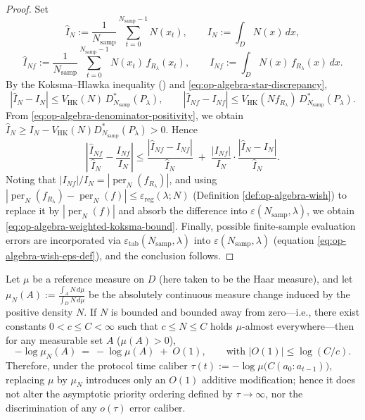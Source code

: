 \begin{proof}
Set
\[
\widehat I_{N}:=\frac{1}{N_{\mathrm{samp}}}\sum_{t=0}^{N_{\mathrm{samp}}-1}N(x_t),\qquad
I_{N}:=\int_D N(x)\,dx,
\]
\[
\widehat I_{Nf}:=\frac{1}{N_{\mathrm{samp}}}\sum_{t=0}^{N_{\mathrm{samp}}-1}N(x_t)\,f_{R_\lambda}(x_t),\qquad
I_{Nf}:=\int_D N(x)\,f_{R_\lambda}(x)\,dx.
\]
By the Koksma--Hlawka inequality (\cite{KuipersNiederreiter1974}) and \eqref{eq:op-algebra-star-discrepancy},
\[
|\widehat I_{N}-I_{N}|\le V_{\mathrm{HK}}(N)\,D_{N_{\mathrm{samp}}}^{\ast}(P_\lambda),
\qquad
|\widehat I_{Nf}-I_{Nf}|\le V_{\mathrm{HK}}(N f_{R_\lambda})\,D_{N_{\mathrm{samp}}}^{\ast}(P_\lambda).
\]
From \eqref{eq:op-algebra-denominator-positivity}, we obtain \(\widehat I_N\ge I_N- V_{\mathrm{HK}}(N)D_{N_{\mathrm{samp}}}^{\ast}(P_\lambda)>0\).
Hence
\[
\left|\frac{\widehat I_{Nf}}{\widehat I_{N}}-\frac{I_{Nf}}{I_{N}}\right|
\le
\frac{|\widehat I_{Nf}-I_{Nf}|}{\widehat I_N}
\;+\;
\frac{|I_{Nf}|}{I_N}\cdot\frac{|\widehat I_N-I_N|}{\widehat I_N}.
\]
Noting that \(|I_{Nf}|/I_N=|\operatorname{per}_N(f_{R_\lambda})|\), and using
\(
|\operatorname{per}_N(f_{R_\lambda})-\operatorname{per}_N(f)|\le \varepsilon_{\mathrm{reg}}(\lambda;N)
\)
(Definition \ref{def:op-algebra-wish}) to replace it by \(|\operatorname{per}_N(f)|\) and absorb the difference into \(\varepsilon(N_{\mathrm{samp}},\lambda)\), we obtain \eqref{eq:op-algebra-weighted-koksma-bound}.
Finally, possible finite-sample evaluation errors are incorporated via \(\varepsilon_{\mathrm{tab}}(N_{\mathrm{samp}},\lambda)\) into \(\varepsilon(N_{\mathrm{samp}},\lambda)\) (equation \eqref{eq:op-algebra-wish-eps-def}), and the conclusion follows.
\end{proof}

\begin{corollary}\label{cor:op-algebra-lapse-time-gauge-invariance}
Let \(\mu\) be a reference measure on \(D\) (here taken to be the Haar measure), and let
\(
\mu_N(A):=\frac{\int_A N\,d\mu}{\int_D N\,d\mu}
\)
be the absolutely continuous measure change induced by the positive density \(N\).
If \(N\) is bounded and bounded away from zero---i.e., there exist constants \(0<c\le C<\infty\) such that \(c\le N\le C\) holds \(\mu\)-almost everywhere---then for any measurable set \(A\) (\(\mu(A)>0\)),
\[
-\log\mu_N(A)
~=~
-\log\mu(A)\;+\;O(1),
\qquad
\text{with }|O(1)|\le \log(C/c).
\]
Therefore, under the protocol time caliber
\(
\tau(t):=-\log\mu\bigl(C(a_0{:}a_{t-1})\bigr)
\),
replacing \(\mu\) by \(\mu_N\) introduces only an \(O(1)\) additive modification; hence it does not alter the asymptotic priority ordering defined by \(\tau\to\infty\), nor the discrimination of any \(o(\tau)\) error caliber.
\end{corollary}

